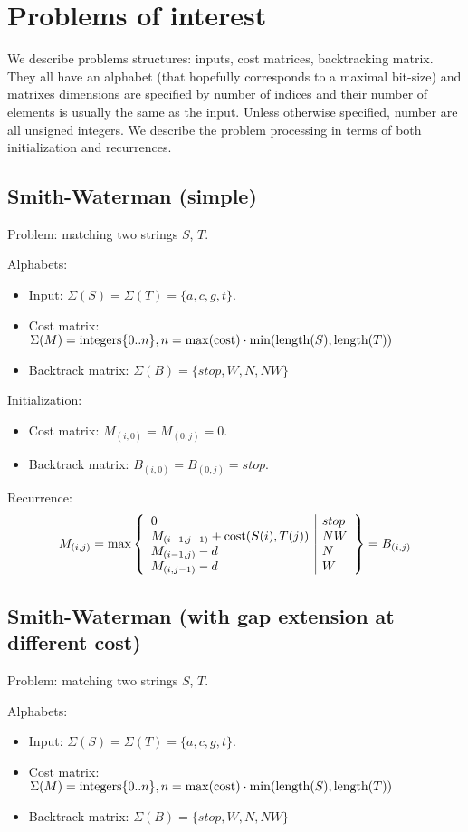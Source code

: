 \documentclass[11pt]{article}
\def\ul{\begin{itemize}}
\def\ule{\end{itemize}}
\begin{document}
\section{Problems of interest}
We describe problems structures: inputs, cost matrices, backtracking matrix. They all have an alphabet (that hopefully corresponds to a maximal bit-size) and matrixes dimensions are specified by number of indices and their number of elements is usually the same as the input. Unless otherwise specified, number are all unsigned integers. We describe the problem processing in terms of both initialization and recurrences.

\subsection{Smith-Waterman (simple)}
Problem: matching two strings $S$, $T$.

Alphabets:\ul
\item Input: $\Sigma(S)=\Sigma(T)=\{a,c,g,t\}$.
\item Cost matrix: $\Sigma(M) = {\rm integers} \{0..n\}, n=\max({\rm cost}) \cdot \min({\rm length}(S),{\rm length}(T))$
\item Backtrack matrix: $\Sigma(B)=\{stop,W,N,NW\}$
\ule

Initialization:\ul
\item Cost matrix: $M_{(i,0)}=M_{(0,j)}=0$.
\item Backtrack matrix: $B_{(i,0)}=B_{(0,j)}=stop$.
\ule

Recurrence:
\[M_{(i,j)}=\max\left\{\begin{array}{l|l}
	0 & stop\\
	M_{(i-1,j-1)}+{\rm cost}(S(i),T(j)) & NW\\
	M_{(i-1,j)}-d & N\\
	M_{(i,j-1)}-d & W
\end{array}\right\}=B_{(i,j)} \]

\subsection{Smith-Waterman (with gap extension at different cost)}
Problem: matching two strings $S$, $T$.

Alphabets:\ul
\item Input: $\Sigma(S)=\Sigma(T)=\{a,c,g,t\}$.
\item Cost matrix: $\Sigma(M) = {\rm integers} \{0..n\}, n=\max({\rm cost}) \cdot \min({\rm length}(S),{\rm length}(T))$
\item Backtrack matrix: $\Sigma(B)=\{stop,W,N,NW\}$
\ule
\end{document}
